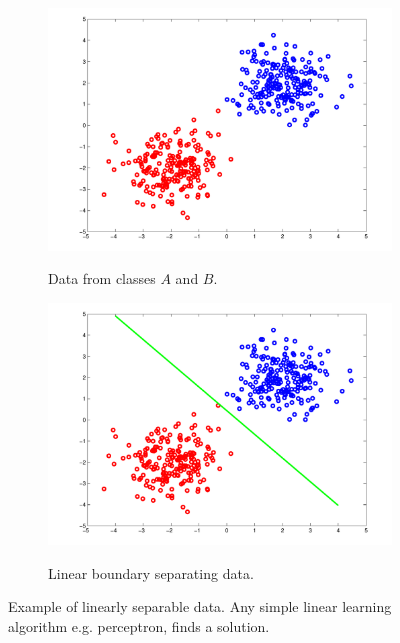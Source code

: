 \documentclass[letterpaper,12pt,peerreviewca,draftcls]{IEEEtran}
\begin{document}
\begin{figure}
\centering
	\begin{subfigure}[t]{0.35\textwidth}
		\includegraphics[width=\linewidth]{"Figure S3a.pdf"}
		\label{fig:linsep_data}
		\caption{Data from classes $A$ and $B$.}
	\end{subfigure}
  	\begin{subfigure}[t]{0.35\textwidth}
		\includegraphics[width=\linewidth]{"Figure S3b.pdf"}
		\label{fig:lin_sep_bound}
		\caption{Linear boundary separating data.}
	\end{subfigure}
    \caption{Example of linearly separable data. Any simple linear learning algorithm e.g. perceptron, finds a solution.}
    \label{fig:linsep}
 \end{figure} 
\end{document}
